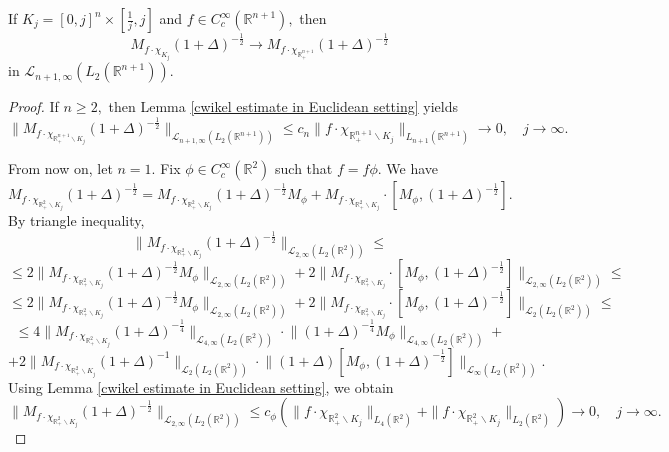\documentclass{amsart}
\begin{document}
\begin{lemma}\label{ii pre-verification lemma} If $K_j=[0,j]^n\times[\frac1j,j]$ and $f\in C^{\infty}_c(\mathbb{R}^{n+1}),$ then
$$M_{f\cdot\chi_{K_j}}(1+\Delta)^{-\frac12}\to M_{f\cdot\chi_{\mathbb{R}^{n+1}_+}}(1+\Delta)^{-\frac12}$$
in $\mathcal{L}_{n+1,\infty}(L_2(\mathbb{R}^{n+1})).$
\end{lemma}
\begin{proof} If $n\geq 2,$ then Lemma \ref{cwikel estimate in Euclidean setting} yields
$$\Big\|M_{f\cdot\chi_{\mathbb{R}^{n+1}_+\backslash K_j}}(1+\Delta)^{-\frac12}\Big\|_{\mathcal{L}_{n+1,\infty}(L_2(\mathbb{R}^{n+1}))}\leq c_n\|f\cdot\chi_{\mathbb{R}^{n+1}_+\backslash K_j}\|_{L_{n+1}(\mathbb{R}^{n+1})}\to0,\quad j\to\infty.$$

From now on, let $n=1.$ Fix $\phi\in C^{\infty}_c(\mathbb{R}^2)$ such that $f=f\phi.$ We have
$$M_{f\cdot\chi_{\mathbb{R}^2_+\backslash K_j}}(1+\Delta)^{-\frac12}=M_{f\cdot\chi_{\mathbb{R}^2_+\backslash K_j}}(1+\Delta)^{-\frac12}M_{\phi}+M_{f\cdot\chi_{\mathbb{R}^2_+\backslash K_j}}\cdot[M_{\phi},(1+\Delta)^{-\frac12}].$$
By triangle inequality,
$$\Big\|M_{f\cdot\chi_{\mathbb{R}^2_+\backslash K_j}}(1+\Delta)^{-\frac12}\Big\|_{\mathcal{L}_{2,\infty}(L_2(\mathbb{R}^2))}\leq$$
$$\leq 2\Big\|M_{f\cdot\chi_{\mathbb{R}^2_+\backslash K_j}}(1+\Delta)^{-\frac12}M_{\phi}\Big\|_{\mathcal{L}_{2,\infty}(L_2(\mathbb{R}^2))}+2\Big\|M_{f\cdot\chi_{\mathbb{R}^2_+\backslash K_j}}\cdot[M_{\phi},(1+\Delta)^{-\frac12}]\Big\|_{\mathcal{L}_{2,\infty}(L_2(\mathbb{R}^2))}\leq $$
$$\leq 2\Big\|M_{f\cdot\chi_{\mathbb{R}^2_+\backslash K_j}}(1+\Delta)^{-\frac12}M_{\phi}\Big\|_{\mathcal{L}_{2,\infty}(L_2(\mathbb{R}^2))}+2\Big\|M_{f\cdot\chi_{\mathbb{R}^2_+\backslash K_j}}\cdot[M_{\phi},(1+\Delta)^{-\frac12}]\Big\|_{\mathcal{L}_2(L_2(\mathbb{R}^2))}\leq $$
$$\leq 4\Big\|M_{f\cdot\chi_{\mathbb{R}^2_+\backslash K_j}}(1+\Delta)^{-\frac14}\Big\|_{\mathcal{L}_{4,\infty}(L_2(\mathbb{R}^2))}\cdot \Big\|(1+\Delta)^{-\frac14}M_{\phi}\Big\|_{\mathcal{L}_{4,\infty}(L_2(\mathbb{R}^2))}+$$
$$+2\Big\|M_{f\cdot\chi_{\mathbb{R}^2_+\backslash K_j}}(1+\Delta)^{-1}\Big\|_{\mathcal{L}_2(L_2(\mathbb{R}^2))}\cdot\Big\|(1+\Delta)[M_{\phi},(1+\Delta)^{-\frac12}]\Big\|_{\mathcal{L}_{\infty}(L_2(\mathbb{R}^2))}.$$
Using Lemma \ref{cwikel estimate in Euclidean setting}, we obtain
$$\Big\|M_{f\cdot\chi_{\mathbb{R}^2_+\backslash K_j}}(1+\Delta)^{-\frac12}\Big\|_{\mathcal{L}_{2,\infty}(L_2(\mathbb{R}^2))}\leq c_{\phi}(\|f\cdot\chi_{\mathbb{R}^2_+\backslash K_j}\|_{L_4(\mathbb{R}^2)}+\|f\cdot\chi_{\mathbb{R}^2_+\backslash K_j}\|_{L_2(\mathbb{R}^2)})\to0,\quad j\to\infty.$$
\end{proof}
\end{document}
